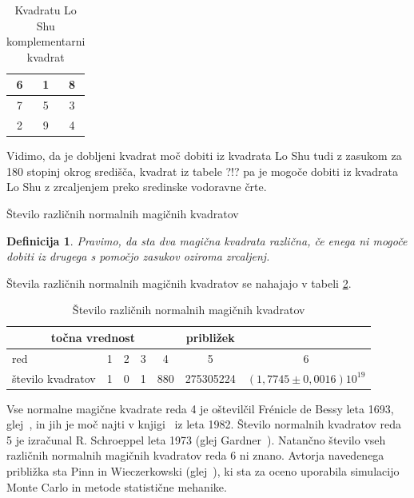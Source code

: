 \documentclass[a4paper,12pt]{article}
\newtheorem{definicija}{Definicija}}
\begin{document}
\begin{table}
   \caption{Kvadratu Lo Shu komplementarni kvadrat}
   \label{table:closhu}
   \large
   \centering
   \begin{tabular}{|c|c|c|}
      \hline
      6 & 1 & 8 \\\hline
      7 & 5 & 3 \\\hline
      2 & 9 & 4 \\\hline
   \end{tabular}
\end{table}

Vidimo, da je dobljeni kvadrat moč dobiti iz kvadrata Lo Shu tudi z zasukom za
180 stopinj okrog središča, kvadrat iz tabele ?!? pa je mogoče dobiti
iz kvadrata Lo Shu z zrcaljenjem preko sredinske vodoravne črte.

Število različnih normalnih magičnih kvadratov

\begin{definicija}
      Pravimo, da sta dva magična kvadrata \emph{različna}, če enega ni mogoče dobiti
      iz drugega s pomočjo zasukov oziroma zrcaljenj.
\end{definicija}

Števila različnih normalnih magičnih kvadratov se nahajajo v tabeli \ref{table:stevila}.

\begin{table}
   \caption{Število različnih normalnih magičnih kvadratov}
   \begin{tabular}{lcccccc}\toprule
      \multicolumn{5}{c}{točna vrednost}
      & približek \\ \midrule 
      red               & 1 & 2 & 3 & 4   & 5         & 6 \\
      število kvadratov & 1 & 0 & 1 & 880 & 275305224 & $(1,7745 \pm 0,0016)10^{19}$\\
      \bottomrule
   \end{tabular}
   \centering
   \label{table:stevila}
\end{table}

Vse normalne magične kvadrate reda 4 je oštevilčil Frénicle de Bessy
leta 1693, glej~\cite{bessy}, in jih je moč najti v knjigi~\cite{berlekamp}
iz leta 1982. Število normalnih kvadratov reda 5 je izračunal
R. Schroeppel leta 1973 (glej Gardner~\cite{gardner}).
Natančno število vseh različnih normalnih magičnih kvadratov reda 6 ni znano.
Avtorja navedenega približka sta Pinn in Wieczerkowski (glej~\cite{pinn}), ki
sta za oceno uporabila simulacijo Monte Carlo in metode statistične mehanike.
\end{document}
